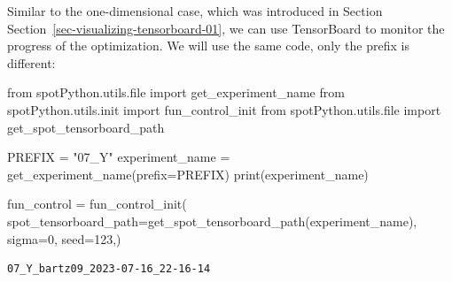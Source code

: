 \documentclass[
  letterpaper,
  DIV=11,
  numbers=noendperiod]{scrreprt}
\newenvironment{Shaded}{\begin{snugshade}}{\end{snugshade}}
\newcommand{\BuiltInTok}[1]{\textcolor[rgb]{0.00,0.23,0.31}{#1}}
\newcommand{\DecValTok}[1]{\textcolor[rgb]{0.68,0.00,0.00}{#1}}
\newcommand{\ImportTok}[1]{\textcolor[rgb]{0.00,0.46,0.62}{#1}}
\newcommand{\NormalTok}[1]{\textcolor[rgb]{0.00,0.23,0.31}{#1}}
\newcommand{\OperatorTok}[1]{\textcolor[rgb]{0.37,0.37,0.37}{#1}}
\newcommand{\StringTok}[1]{\textcolor[rgb]{0.13,0.47,0.30}{#1}}
\begin{document}
\begin{tcolorbox}[enhanced jigsaw, left=2mm, title=\textcolor{quarto-callout-note-color}{\faInfo}\hspace{0.5em}{TensorBoard}, titlerule=0mm, toprule=.15mm, leftrule=.75mm, colbacktitle=quarto-callout-note-color!10!white, colback=white, arc=.35mm, toptitle=1mm, bottomtitle=1mm, colframe=quarto-callout-note-color-frame, bottomrule=.15mm, rightrule=.15mm, breakable, coltitle=black, opacitybacktitle=0.6, opacityback=0]

Similar to the one-dimensional case, which was introduced in Section
Section~\ref{sec-visualizing-tensorboard-01}, we can use TensorBoard to
monitor the progress of the optimization. We will use the same code,
only the prefix is different:

\begin{Shaded}
\begin{Highlighting}[]
\ImportTok{from}\NormalTok{ spotPython.utils.}\BuiltInTok{file} \ImportTok{import}\NormalTok{ get\_experiment\_name}
\ImportTok{from}\NormalTok{ spotPython.utils.init }\ImportTok{import}\NormalTok{ fun\_control\_init}
\ImportTok{from}\NormalTok{ spotPython.utils.}\BuiltInTok{file} \ImportTok{import}\NormalTok{ get\_spot\_tensorboard\_path}

\NormalTok{PREFIX }\OperatorTok{=} \StringTok{"07\_Y"}
\NormalTok{experiment\_name }\OperatorTok{=}\NormalTok{ get\_experiment\_name(prefix}\OperatorTok{=}\NormalTok{PREFIX)}
\BuiltInTok{print}\NormalTok{(experiment\_name)}

\NormalTok{fun\_control }\OperatorTok{=}\NormalTok{ fun\_control\_init(}
\NormalTok{    spot\_tensorboard\_path}\OperatorTok{=}\NormalTok{get\_spot\_tensorboard\_path(experiment\_name),}
\NormalTok{    sigma}\OperatorTok{=}\DecValTok{0}\NormalTok{,}
\NormalTok{    seed}\OperatorTok{=}\DecValTok{123}\NormalTok{,)}
\end{Highlighting}
\end{Shaded}

\begin{verbatim}
07_Y_bartz09_2023-07-16_22-16-14
\end{verbatim}

\end{tcolorbox}
\end{document}
